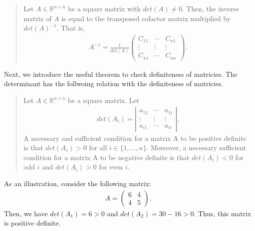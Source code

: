 \documentclass[
  12pt,
]{article}
\begin{document}
\begin{quote}
Let \(A \in \mathbb{R}^{n \times n}\) be a square matrix with \(det(A) \not= 0\).
Then, the inverse matrix of \(A\) is equal to the transposed cofactor matrix multiplied by \(det(A)^{-1}\). That is,
\begin{align*}
A^{-1} = \frac{1}{det(A)} 
\begin{pmatrix}
C_{11} & \cdots & C_{n1} \\
\vdots & \vdots & \vdots \\
C_{1n} & \cdots & C_{nn}
\end{pmatrix}. 
\end{align*}
\end{quote}

Next, we introduce the useful theorem to check definiteness of matricies.
The determinant has the follwoing relation with the definiteness of matricies.

\begin{quote}
Let \(A \in \mathbb{R}^{n \times n}\) be a square matrix. Let
\begin{align*}
det(A_i) = 
\left| \begin{array}{ccc}
a_{11} & \cdots & a_{1i} \\
\vdots & \vdots & \vdots \\
a_{i1} & \cdots & a_{ii}
\end{array} \right|. 
\end{align*}
A necessary and sufficient condition for a matrix A to be positive definite is that \(det(A_i) > 0\) for all \(i \in \{1, \ldots, n\}\).
Moreover, a necessary sufficient condition for a matrix A to be negative definite is
that \(det(A_i) < 0\) for odd \(i\) and \(det(A_i) > 0\) for even \(i\).
\end{quote}

As an illustration, consider the following matrix:
\begin{align*}
  A = 
  \begin{pmatrix}
    6 & 4 \\
    4 & 5
  \end{pmatrix}.
\end{align*}
Then, we have \(det(A_1) = 6 > 0\) and \(det(A_2) = 30 - 16 > 0\).
Thus, this matrix is positive definite.
\end{document}
